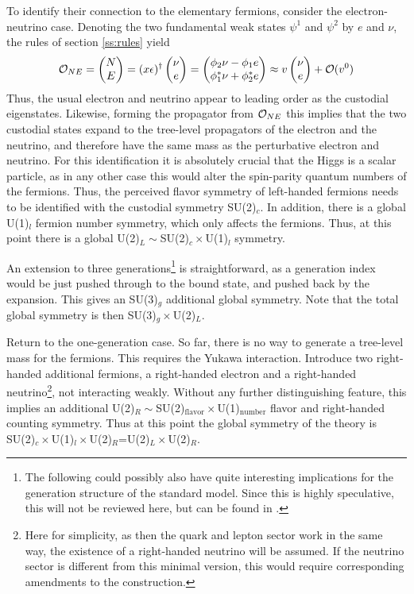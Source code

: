 \documentclass[final,12pt]{article}
\newcommand*{\no}{\noindent}
\newcommand*{\be}{\begin{equation}}
\newcommand*{\ee}{\end{equation}}
\newcommand*{\1}{1\!\!\!\bot}
\newcommand*{\bma}{\begin{matrix}}
\newcommand*{\ema}{\end{matrix}}
\newcommand*{\bpm}{\left(\bma}
\newcommand*{\epm}{\ema\right)}
\newcommand*{\op}{{\cal O}}
\begin{document}
To identify their connection to the elementary fermions, consider the electron-neutrino case. Denoting the two fundamental weak states $\psi^1$ and $\psi^2$ by $e$ and $\nu$, the rules of section \ref{ss:rules} yield \cite{Frohlich:1980gj,Frohlich:1981yi,Egger:2017tkd}
\be
\mathcal{O}_{NE}=\bpm N\cr E\epm=(x\epsilon)^\dagger \bpm \nu \\ e \epm = \bpm \phi_2 \nu  -  \phi_1 e  \\  \phi_1^* \nu + \phi_2^* e  \epm\approx v\bpm \nu\cr e\epm+{\cal O}(v^0)\label{opfermexp}
\ee
\no Thus, the usual electron and neutrino appear to leading order as the custodial eigenstates. Likewise, forming the propagator from $\op_{NE}$ this implies that the two custodial states expand to the tree-level propagators of the electron and the neutrino, and therefore have the same mass as the perturbative electron and neutrino. For this identification it is absolutely crucial that the Higgs is a scalar particle, as in any other case this would alter the spin-parity quantum numbers of the fermions. Thus, the perceived flavor symmetry of left-handed fermions needs to be identified with the custodial symmetry SU(2)$_c$. In addition, there is a global U(1)$_l$ fermion number symmetry, which only affects the fermions. Thus, at this point there is a global U(2)$_L\sim$SU(2)$_c\times$U(1)$_l$ symmetry.

An extension to three generations\footnote{The following could possibly also have quite interesting implications for the generation structure of the standard model. Since this is highly speculative, this will not be reviewed here, but can be found in \cite{Egger:2017tkd}.} is straightforward, as a generation index would be just pushed through to the bound state, and pushed back by the expansion. This gives an SU(3)$_g$ additional global symmetry. Note that the total global symmetry is then SU(3)$_g\times$U(2)$_L$.

Return to the one-generation case. So far, there is no way to generate a tree-level mass for the fermions. This requires the Yukawa interaction. Introduce two right-handed additional fermions, a right-handed electron and a right-handed neutrino\footnote{Here for simplicity, as then the quark and lepton sector work in the same way, the existence of a right-handed neutrino will be assumed. If the neutrino sector is different from this minimal version, this would require corresponding amendments to the construction.}, not interacting weakly. Without any further distinguishing feature, this implies an additional U(2)$_R\sim$SU(2)$_\text{flavor}\times$U(1)$_\text{number}$ flavor and right-handed counting symmetry. Thus at this point the global symmetry of the theory is SU(2)$_c\times$U(1)$_l\times$U(2)$_R$=U(2)$_L\times$U(2)$_R$.
\end{document}
